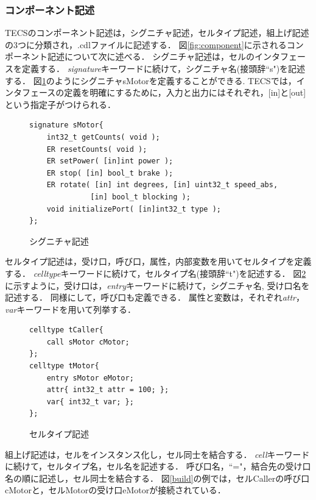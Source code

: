 \documentclass[submit,techrep]{ipsj}
\begin{document}
\subsubsection{コンポーネント記述}
TECSのコンポーネント記述は，シグニチャ記述，セルタイプ記述，組上げ記述の3つに分類され，.cdlファイルに記述する．
図\ref{fig:component}に示されるコンポーネント記述について次に述べる．
        シグニチャ記述は，セルのインタフェースを定義する．
        {\it signature}キーワードに続けて，シグニチャ名(接頭辞``s")を記述する．
        図\ref{signature}のようにシグニチャsMotorを定義することができる.
        TECSでは，インタフェースの定義を明確にするために，入力と出力にはそれぞれ，[in]と[out]という指定子がつけられる．
        
\begin{figure}[t]
\centering
\begin{lstlisting}
signature sMotor{
    int32_t getCounts( void );
    ER resetCounts( void );
    ER setPower( [in]int power );
    ER stop( [in] bool_t brake );
    ER rotate( [in] int degrees, [in] uint32_t speed_abs,
              [in] bool_t blocking );
    void initializePort( [in]int32_t type );
};
\end{lstlisting}
\caption{シグニチャ記述}
\label{signature}
\end{figure}

        セルタイプ記述は，受け口，呼び口，属性，内部変数を用いてセルタイプを定義する．
        {\it celltype}キーワードに続けて，セルタイプ名(接頭辞``t")を記述する．
        図\ref{celltype}に示すように，受け口は，{\it entry}キーワードに続けて，シグニチャ名, 受け口名を記述する．
        同様にして，呼び口も定義できる．
        属性と変数は，それぞれ{\it attr}，{\it var}キーワードを用いて列挙する．

\begin{figure}[t]
\centering
\begin{lstlisting}
celltype tCaller{
    call sMotor cMotor;
};
celltype tMotor{
    entry sMotor eMotor;
    attr{ int32_t attr = 100; };
    var{ int32_t var; };
};
\end{lstlisting}
\caption{セルタイプ記述}
\label{celltype}
\end{figure}

        組上げ記述は，セルをインスタンス化し，セル同士を結合する．
        {\it cell}キーワードに続けて，セルタイプ名，セル名を記述する．
        呼び口名，``="，結合先の受け口名の順に記述し，セル同士を結合する．
        図\ref{build}の例では，セルCallerの呼び口cMotorと，セルMotorの受け口eMotorが接続されている．
        
\end{document}
